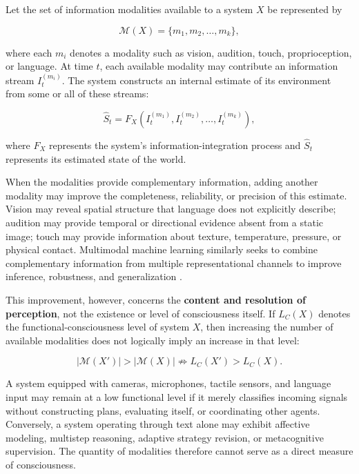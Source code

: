 Let the set of information modalities available to a system \(X\) be represented by

\begin{equation}\label{eq16}
\mathcal{M}(X)
=
\{m_1,m_2,\ldots,m_k\},
\end{equation}

where each \(m_i\) denotes a modality such as vision, audition, touch, proprioception, or language. At time \(t\), each available modality may contribute an information stream \(I_t^{(m_i)}\). The system constructs an internal estimate of its environment from some or all of these streams:

\begin{equation}\label{eq17}
\widehat{S}_t
=
F_X
\left(
I_t^{(m_1)},
I_t^{(m_2)},
\ldots,
I_t^{(m_k)}
\right),
\end{equation}

where \(F_X\) represents the system's information-integration process and \(\widehat{S}_t\) represents its estimated state of the world.

When the modalities provide complementary information, adding another modality may improve the completeness, reliability, or precision of this estimate. Vision may reveal spatial structure that language does not explicitly describe; audition may provide temporal or directional evidence absent from a static image; touch may provide information about texture, temperature, pressure, or physical contact. Multimodal machine learning similarly seeks to combine complementary information from multiple representational channels to improve inference, robustness, and generalization \cite{baltrusaitis2019multimodal}.

This improvement, however, concerns the \textbf{content and resolution of perception}, not the existence or level of consciousness itself. If \(L_C(X)\) denotes the functional-consciousness level of system \(X\), then increasing the number of available modalities does not logically imply an increase in that level:

\begin{equation}\label{eq18}
\left|
\mathcal{M}(X')
\right|
>
\left|
\mathcal{M}(X)
\right|
\not\Rightarrow
L_C(X')
>
L_C(X).
\end{equation}

A system equipped with cameras, microphones, tactile sensors, and language input may remain at a low functional level if it merely classifies incoming signals without constructing plans, evaluating itself, or coordinating other agents. Conversely, a system operating through text alone may exhibit affective modeling, multistep reasoning, adaptive strategy revision, or metacognitive supervision. The quantity of modalities therefore cannot serve as a direct measure of consciousness.

